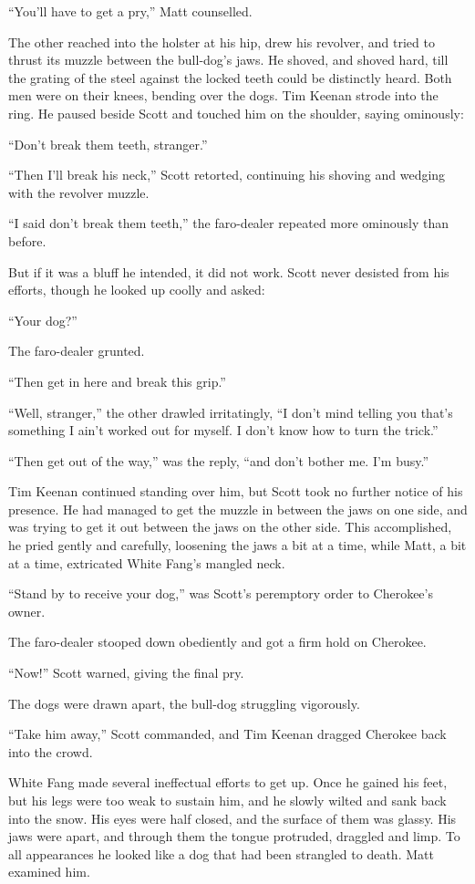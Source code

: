 \documentclass[10pt]{book}
\begin{document}
“You’ll have to get a pry,” Matt counselled.

The other reached into the holster at his hip, drew his revolver, and
tried to thrust its muzzle between the bull-dog’s jaws. He shoved, and
shoved hard, till the grating of the steel against the locked teeth
could be distinctly heard. Both men were on their knees, bending over
the dogs. Tim Keenan strode into the ring. He paused beside Scott and
touched him on the shoulder, saying ominously:

“Don’t break them teeth, stranger.”

“Then I’ll break his neck,” Scott retorted, continuing his shoving and
wedging with the revolver muzzle.

“I said don’t break them teeth,” the faro-dealer repeated more
ominously than before.

But if it was a bluff he intended, it did not work. Scott never
desisted from his efforts, though he looked up coolly and asked:

“Your dog?”

The faro-dealer grunted.

“Then get in here and break this grip.”

“Well, stranger,” the other drawled irritatingly, “I don’t mind telling
you that’s something I ain’t worked out for myself. I don’t know how to
turn the trick.”

“Then get out of the way,” was the reply, “and don’t bother me. I’m
busy.”

Tim Keenan continued standing over him, but Scott took no further
notice of his presence. He had managed to get the muzzle in between the
jaws on one side, and was trying to get it out between the jaws on the
other side. This accomplished, he pried gently and carefully, loosening
the jaws a bit at a time, while Matt, a bit at a time, extricated White
Fang’s mangled neck.

“Stand by to receive your dog,” was Scott’s peremptory order to
Cherokee’s owner.

The faro-dealer stooped down obediently and got a firm hold on
Cherokee.

“Now!” Scott warned, giving the final pry.

The dogs were drawn apart, the bull-dog struggling vigorously.

“Take him away,” Scott commanded, and Tim Keenan dragged Cherokee back
into the crowd.

White Fang made several ineffectual efforts to get up. Once he gained
his feet, but his legs were too weak to sustain him, and he slowly
wilted and sank back into the snow. His eyes were half closed, and the
surface of them was glassy. His jaws were apart, and through them the
tongue protruded, draggled and limp. To all appearances he looked like
a dog that had been strangled to death. Matt examined him.
\end{document}
